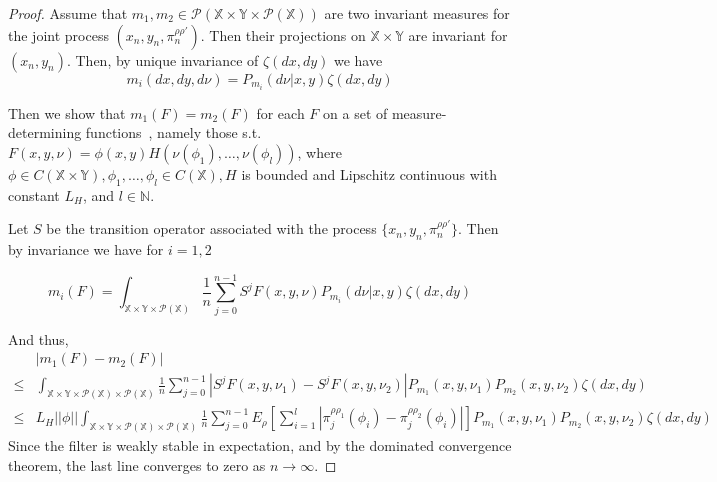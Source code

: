 \documentclass{article}
\begin{document}
\begin{proof}
    Assume that \( m_1,m_2 \in \mathcal{P}(\mathbb{X} \times \mathbb{Y} \times \mathcal{P}(\mathbb{X})) \) are two invariant measures for the joint process \( (x_n,y_n,\pi_n^{\rho\rho'}) \). Then their projections on \( \mathbb{X} \times \mathbb{Y} \) are invariant for \( (x_n, y_n) \). Then, by unique invariance of \( \zeta(dx,dy) \) we have
    \[ m_i(dx,dy,d\nu) = P_{m_i}(d\nu | x,y)\zeta(dx,dy) \]

    Then we show that \( m_1(F) = m_2(F) \) for each \( F \) on a set of measure-determining functions~\cite{Stettner}, namely those s.t. \( F(x,y,\nu) = \phi(x,y)H(\nu(\phi_1),\ldots,\nu(\phi_l)) \), where \( \phi \in C(\mathbb{X} \times \mathbb{Y}), \phi_1,\ldots,\phi_l \in C(\mathbb{X}), H \) is bounded and Lipschitz continuous with constant \( L_H \), and \( l \in \mathbb{N} \).

    Let \( S \) be the transition operator associated with the process \( \{x_n,y_n,\pi_n^{\rho\rho'} \} \). Then by invariance we have for \( i=1,2 \)

    \[ m_i(F) =  \int_{\mathbb{X} \times \mathbb{Y} \times \mathcal{P}(\mathbb{X})} \frac{1}{n}\sum_{j=0}^{n-1}S^j F(x,y,\nu)P_{m_i}(d\nu | x,y)\zeta(dx,dy) \]

    And thus,
    \begin{align*}
            & |m_1(F) - m_2(F)|                                                                                                                                                                                                                                                           \\
        \le & \int_{\mathbb{X} \times \mathbb{Y} \times \mathcal{P}(\mathbb{X}) \times \mathcal{P}(\mathbb{X})} \frac{1}{n}\sum_{j=0}^{n-1} |S^j F(x,y,\nu_1) - S^j F(x,y,\nu_2)|P_{m_1}(x,y,\nu_1)P_{m_2}(x,y,\nu_2)\zeta(dx,dy)                                                         \\
        \le & L_H ||\phi|| \int_{\mathbb{X} \times \mathbb{Y} \times \mathcal{P}(\mathbb{X}) \times \mathcal{P}(\mathbb{X})} \frac{1}{n}\sum_{j=0}^{n-1}E_{\rho}[\sum_{i=1}^{l}|\pi_j^{\rho\rho_1}(\phi_i) - \pi_j^{\rho\rho_2}(\phi_i)|]P_{m_1}(x,y,\nu_1)P_{m_2}(x,y,\nu_2)\zeta(dx,dy)
    \end{align*}
    Since the filter is weakly stable in expectation, and by the dominated convergence theorem, the last line converges to zero as \( n \to \infty \).
\end{proof}
\end{document}
